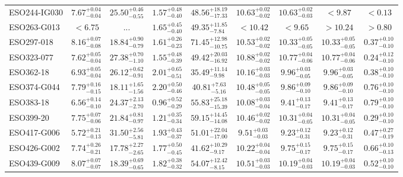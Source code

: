 \documentclass[onecolumn]{mn2e}
\begin{document}
{\begin{center}
\begin{longtable}{lcccccccc}
ESO244-IG030 & $7.67_{-0.04}^{+0.04}$ & $25.50_{-0.55}^{+0.46}$ & $1.57_{-0.40}^{+0.48}$ &$48.56_{-17.33}^{+18.19}$ & $10.63_{-0.02}^{+0.02}$ & $10.63_{-0.03}^{+0.02}$ & $<9.87$ & $<0.13$ \\
ESO263-G013 & $<6.75$ & ... & $1.65_{-0.40}^{+0.45}$ &$49.35_{-7.84}^{+11.85}$ & $<10.42$ & $<9.65$ & $>10.24$ & $>0.80$ \\
ESO297-018 & $8.16_{-0.08}^{+0.07}$ & $18.84_{-0.79}^{+0.90}$ & $1.61_{-0.23}^{+0.26}$ &$71.45_{-10.75}^{+12.98}$ & $10.53_{-0.02}^{+0.02}$ & $10.33_{-0.05}^{+0.05}$ & $10.33_{-0.05}^{+0.05}$ & $0.37_{-0.10}^{+0.10}$ \\
ESO323-077 & $7.62_{-0.04}^{+0.05}$ & $27.38_{-1.10}^{+0.70}$ & $1.55_{-0.39}^{+0.48}$ &$49.42_{-16.92}^{+20.03}$ & $10.88_{-0.02}^{+0.02}$ & $10.77_{-0.06}^{+0.04}$ & $10.77_{-0.06}^{+0.04}$ & $0.24_{-0.10}^{+0.12}$ \\
ESO362-18 & $6.93_{-0.04}^{+0.05}$ & $26.12_{-0.91}^{+0.62}$ & $2.01_{-0.51}^{+0.65}$ &$35.49_{-9.98}^{+11.14}$ & $10.16_{-0.03}^{+0.03}$ & $9.96_{-0.05}^{+0.03}$ & $9.96_{-0.05}^{+0.03}$ & $0.38_{-0.10}^{+0.10}$ \\
ESO374-G044 & $7.79_{-0.15}^{+0.16}$ & $18.11_{-1.56}^{+1.65}$ & $2.20_{-0.46}^{+0.50}$ &$40.81_{-5.16}^{+7.63}$ & $10.48_{-0.05}^{+0.05}$ & $9.86_{-0.10}^{+0.09}$ & $9.86_{-0.10}^{+0.09}$ & $0.76_{-0.10}^{+0.10}$ \\
ESO383-18 & $6.56_{-0.10}^{+0.14}$ & $24.37_{-2.70}^{+2.13}$ & $0.96_{-0.29}^{+0.52}$ &$55.83_{-15.39}^{+25.18}$ & $10.08_{-0.04}^{+0.03}$ & $9.41_{-0.17}^{+0.13}$ & $9.41_{-0.17}^{+0.13}$ & $0.79_{-0.10}^{+0.10}$ \\
ESO399-20 & $7.75_{-0.06}^{+0.07}$ & $21.84_{-0.97}^{+0.81}$ & $1.21_{-0.34}^{+0.35}$ &$59.15_{-14.08}^{+14.45}$ & $10.46_{-0.02}^{+0.02}$ & $10.31_{-0.05}^{+0.04}$ & $10.31_{-0.05}^{+0.04}$ & $0.29_{-0.10}^{+0.10}$ \\
ESO417-G006 & $5.72_{-0.13}^{+0.21}$ & $31.50_{-5.81}^{+2.56}$ & $1.93_{-0.37}^{+0.43}$ &$51.01_{-17.00}^{+22.04}$ & $9.51_{-0.03}^{+0.03}$ & $9.23_{-0.31}^{+0.12}$ & $9.23_{-0.31}^{+0.12}$ & $0.47_{-0.19}^{+0.27}$ \\
ESO426-G002 & $7.74_{-0.21}^{+0.26}$ & $17.78_{-2.65}^{+2.27}$ & $1.77_{-0.45}^{+0.50}$ &$41.62_{-9.17}^{+10.29}$ & $10.22_{-0.04}^{+0.04}$ & $9.75_{-0.17}^{+0.15}$ & $9.75_{-0.17}^{+0.15}$ & $0.66_{-0.13}^{+0.10}$ \\
ESO439-G009 & $8.07_{-0.07}^{+0.07}$ & $18.39_{-0.65}^{+0.69}$ & $1.82_{-0.32}^{+0.38}$ &$54.07_{-8.15}^{+12.42}$ & $10.51_{-0.03}^{+0.03}$ & $10.19_{-0.03}^{+0.04}$ & $10.19_{-0.03}^{+0.04}$ & $0.52_{-0.10}^{+0.10}$ \\

\end{longtable}
\end{center}}
\end{document}
